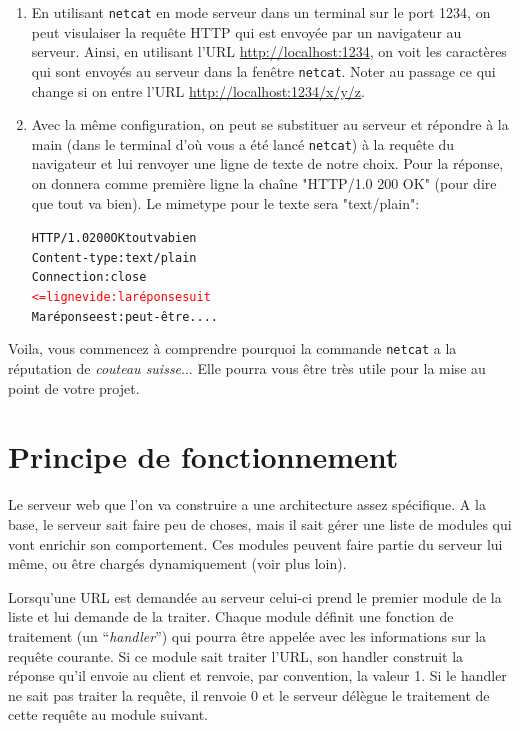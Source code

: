 \documentclass[10pt,a4paper]{article}
\begin{document}
\begin{enumerate}
\item En utilisant \texttt{netcat} en mode serveur dans un terminal
  sur le port 1234, on peut visulaiser la requête HTTP qui est envoyée
  par un navigateur au serveur. Ainsi, en utilisant l'URL
  \url{http://localhost:1234}, on voit les caractères qui sont envoyés
  au serveur dans la fenêtre \texttt{netcat}. Noter au passage ce qui
  change si on entre l'URL \url{http://localhost:1234/x/y/z}.

\item Avec la même configuration, on peut se substituer au serveur et
  répondre à la main (dans le terminal d'où vous a été lancé
  \texttt{netcat}) à la requête du navigateur et lui renvoyer une
  ligne de texte de notre choix. Pour la réponse, on donnera comme
  première ligne la chaîne "HTTP/1.0 200 OK" (pour dire que tout va
  bien). Le mimetype pour le texte sera "text/plain":
\begin{alltt}
       HTTP/1.0 200 OK tout va bien
       Content-type: text/plain
       Connection: close
          \textcolor{red}{<= ligne vide: la réponse suit}
       Ma réponse est: peut-être....
\end{alltt}
\end{enumerate}

Voila, vous commencez à comprendre pourquoi la commande
\texttt{netcat} a la réputation de \emph{couteau suisse}... Elle pourra
vous être très utile pour la mise au point de votre projet.
 

\section*{Principe de fonctionnement}

Le serveur web que l'on va construire a une architecture assez
spécifique. A la base, le serveur sait faire peu de choses, mais il
sait gérer une liste de modules qui vont enrichir son
comportement. Ces modules peuvent faire partie du serveur lui même, ou
être chargés dynamiquement (voir plus loin).

Lorsqu'une URL est demandée au serveur celui-ci prend le premier
module de la liste et lui demande de la traiter. Chaque module définit
une fonction de traitement (un ``\emph{handler}'') qui pourra être
appelée avec les informations sur la requête courante. Si ce module
sait traiter l'URL, son handler construit la réponse qu'il envoie au
client et renvoie, par convention, la valeur 1. Si le handler ne sait
pas traiter la requête, il renvoie 0 et le serveur délègue le
traitement de cette requête au module suivant.
\end{document}
